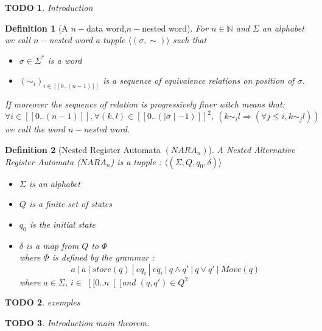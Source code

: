 \documentclass[a4paper,10pt]{report}
\title{}
\author{}
\newtheorem{df}{Definition}
\newtheorem{td}{TODO}
\newcommand{\seg}[1]{[\![#1]\!]}
\newcommand{\sego}[1]{\left [\![ #1 \right [\![}
\newcommand{\segw}[1]{\seg{0..(\mid #1\mid -1)}}
\newcommand{\ts}{$\sego{0 .. n}$}
\begin{document}
\maketitle

\begin{td}
  Introduction
\end{td}

\begin{df}[A $n-$data word,$n-$nested word]
 For $n \in \mathbb{N}$ and $\Sigma$ an alphabet we call $n-$nested word a tupple  
 $\langle (\sigma , \sim )  \rangle$
 such that 
  \begin{itemize}
   \item $\sigma \in \Sigma^* $ is a word
   \item $(\sim_i)_{i \in \seg{0 .. (n-1)} }$ is a sequence of equivalence relations on position of $\sigma$. 
  \end{itemize}
  If moreover the sequence of relation is progressively finer witch means that:  
  $$\forall i \in \seg{0 .. (n-1)}, \forall (k,l) \in \segw{\sigma}^2, \ (k \sim_i l \Rightarrow \left ( \forall j \leq i, k \sim_{j} l \right )) $$ 
   we call the word $n-$nested word.
\end{df}



\begin{df}[Nested Register Automata $(NARA_n)$]
  A Nested Alternative Register Automata ($NARA_n$) is a tupple : 
  $\langle (\Sigma ,Q ,q_0, \delta )  \rangle$
  \begin{itemize}
   \item $\Sigma$ is an alphabet
   \item $Q$ is a finite set of states
   \item $q_0$ is the initial state 
   \item $ \delta $ is a map from $Q $ to $\Phi $ \\ 
   where $\Phi$ is defined by the grammar : 
   $$ a \ | \  \overline{a} \ | \ store(q) \ | \ eq_i \ | \  \overline{eq_i} \ | \  q \wedge q' \ | \ q \vee q' \ | \ Move(q)  $$
  where $a \in \Sigma$, $i \in $ \ts  and $(q,q') \in Q^2$
  \end{itemize}

\end{df}
\begin{td}
  exemples
\end{td}

\begin{td}
  Introduction main theorem.
\end{td}
\end{document}
